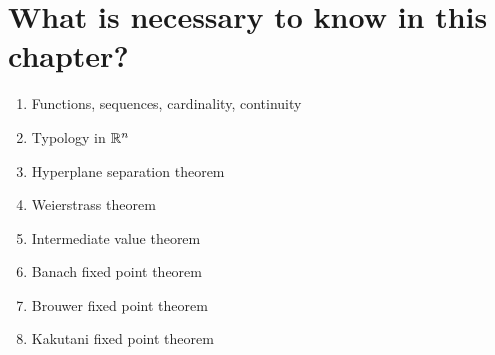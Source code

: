 \section{What is necessary to know in this chapter?}
\begin{enumerate}
    \item Functions, sequences, cardinality, continuity
    \item Typology in $\mathbb{R}^n$
    \item Hyperplane separation theorem
    \item Weierstrass theorem
    \item Intermediate value theorem
    \item Banach fixed point theorem
    \item Brouwer fixed point theorem
    \item Kakutani fixed point theorem
\end{enumerate}

